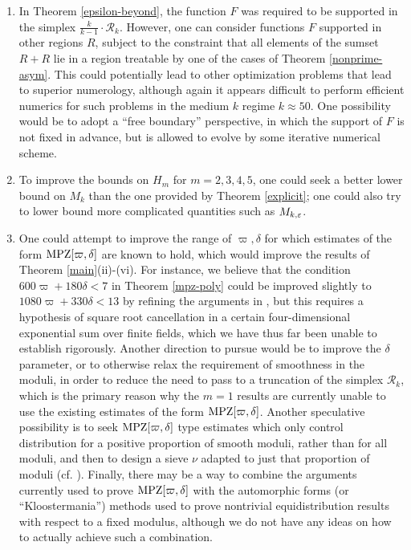\begin{enumerate}
\item In Theorem \ref{epsilon-beyond}, the function $F$ was required to be supported in the simplex $\frac{k}{k-1} \cdot {\mathcal R}_k$.  However, one can consider functions $F$ supported in other regions $R$, subject to the constraint that all elements of the sumset $R+R$ lie in a region treatable by one of the cases of Theorem \ref{nonprime-asym}.  This could potentially lead to other optimization problems that lead to superior numerology, although again it appears difficult to perform efficient numerics for such problems in the medium $k$ regime $k \approx 50$.  One possibility would be to adopt a ``free boundary'' perspective, in which the support of $F$ is not fixed in advance, but is allowed to evolve by some iterative numerical scheme.
\item To improve the bounds on $H_m$ for $m=2,3,4,5$, one could seek a better lower bound on $M_k$ than the one provided by Theorem \ref{explicit}; one could also try to lower bound more complicated quantities such as $M_{k,\varepsilon}$.
\item One could attempt to improve the range of $\varpi,\delta$ for which estimates of the form $\operatorname*{MPZ}[\varpi,\delta]$ are known to hold, which would improve the results of Theorem \ref{main}(ii)-(vi).  For instance, we believe that the condition $600 \varpi + 180\delta < 7$ in Theorem \ref{mpz-poly} could be improved slightly to $1080 \varpi + 330 \delta < 13$ by refining the arguments in \cite{polymath8a}, but this requires a hypothesis of square root cancellation in a certain four-dimensional exponential sum over finite fields, which we have thus far been unable to establish rigorously.  Another direction to pursue would be to improve the $\delta$ parameter, or to otherwise relax the requirement of smoothness in the moduli, in order to reduce the need to pass to a truncation of the simplex ${\mathcal R}_k$, which is the primary reason why the $m=1$ results are currently unable to use the existing estimates of the form $\operatorname*{MPZ}[\varpi,\delta]$.  Another speculative possibility is to seek $\operatorname*{MPZ}[\varpi,\delta]$ type estimates which only control distribution for a positive proportion of smooth moduli, rather than for all moduli, and then to design a sieve $\nu$ adapted to just that proportion of moduli (cf. \cite{fouvry-invent}).  Finally, there may be a way to combine the arguments currently used to prove $\operatorname*{MPZ}[\varpi,\delta]$ with the automorphic forms (or ``Kloostermania'') methods used to prove nontrivial equidistribution results with respect to a fixed modulus, although we do not have any ideas on how to actually achieve such a combination.

\end{enumerate}
